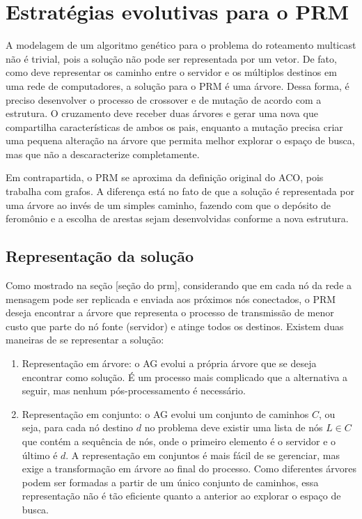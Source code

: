 \chapter[Estratégias evolutivas para o PRM]{Estratégias evolutivas para o PRM}

A modelagem de um algoritmo genético para o problema do roteamento multicast não é trivial, pois a solução não pode ser representada por um vetor. De fato, como deve representar os caminho entre o servidor e os múltiplos destinos em uma rede de computadores, a solução para o PRM é uma árvore. Dessa forma, é preciso desenvolver o processo de crossover e de mutação de acordo com a estrutura. O cruzamento deve receber duas árvores e gerar uma nova que compartilha características de ambos os pais, enquanto a mutação precisa criar uma pequena alteração na árvore que permita melhor explorar o espaço de busca, mas que não a descaracterize completamente.

Em contrapartida, o PRM se aproxima da definição original do ACO, pois trabalha com grafos. A diferença está no fato de que a solução é representada por uma árvore ao invés de um simples caminho, fazendo com que o depósito de feromônio e a escolha de arestas sejam desenvolvidas conforme a nova estrutura.

\section{Representação da solução}

Como mostrado na seção [seção do prm], considerando que em cada nó da rede a mensagem pode ser replicada e enviada aos próximos nós conectados, o PRM deseja encontrar a árvore que representa o processo de transmissão de menor custo que parte do nó fonte (servidor) e atinge todos os destinos. Existem duas maneiras de se representar a solução:

\begin{enumerate}
	\item Representação em árvore: o AG evolui a própria árvore que se deseja encontrar como solução. É um processo mais complicado que a alternativa a seguir, mas nenhum pós-processamento é necessário.
	\item Representação em conjunto: o AG evolui um conjunto de caminhos $C$, ou seja, para cada nó destino $d$ no problema deve existir uma lista de nós $L \in C$ que contém a sequência de nós, onde o primeiro elemento é o servidor e o último é $d$. A representação em conjuntos é mais fácil de se gerenciar, mas exige a transformação em árvore ao final do processo. Como diferentes árvores podem ser formadas a partir de um único conjunto de caminhos, essa representação não é tão eficiente quanto a anterior ao explorar o espaço de busca.
\end{enumerate}

